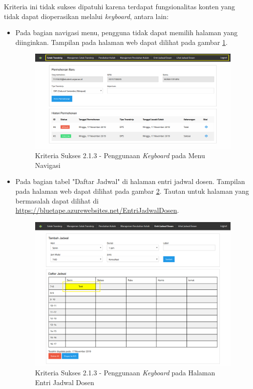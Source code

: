 \documentclass[a4paper,twoside]{article}
\begin{document}
\begin{enumerate}
		Kriteria ini tidak sukses dipatuhi karena terdapat fungsionalitas konten yang tidak dapat dioperasikan melalui \textit{keyboard}, antara lain:

		\begin{itemize}
			\item Pada bagian navigasi menu, pengguna tidak dapat memilih halaman yang diinginkan. Tampilan pada halaman web dapat dilihat pada gambar \ref{fig:2.1.3_keyboard_no_exception_1}.
			\begin{figure}[H]
				\centering  
				\includegraphics[scale=0.3, frame]{kriteria-sukses-2-1-3-keyboard-no-exception-1}  
				\caption[Kriteria Sukses 2.1.3 - Penggunaan \textit{Keyboard} pada Menu Navigasi]{Kriteria Sukses 2.1.3 - Penggunaan \textit{Keyboard} pada Menu Navigasi}
				\label{fig:2.1.3_keyboard_no_exception_1}  
			\end{figure} 

			\item Pada bagian tabel "Daftar Jadwal" di halaman entri jadwal dosen. Tampilan pada halaman web dapat dilihat pada gambar \ref{fig:2.1.3_keyboard_no_exception_2}. Tautan untuk halaman yang bermasalah dapat dilihat di \url{https://bluetape.azurewebsites.net/EntriJadwalDosen}.
			\begin{figure}[H]
				\centering  
				\includegraphics[scale=0.3, frame]{kriteria-sukses-2-1-3-keyboard-no-exception-2}  
				\caption[Kriteria Sukses 2.1.3 - Penggunaan \textit{Keyboard} pada Halaman Entri Jadwal Dosen]{Kriteria Sukses 2.1.3 - Penggunaan \textit{Keyboard} pada Halaman Entri Jadwal Dosen}
				\label{fig:2.1.3_keyboard_no_exception_2}  
			\end{figure} 
		\end{itemize}


\end{enumerate}
\end{document}
